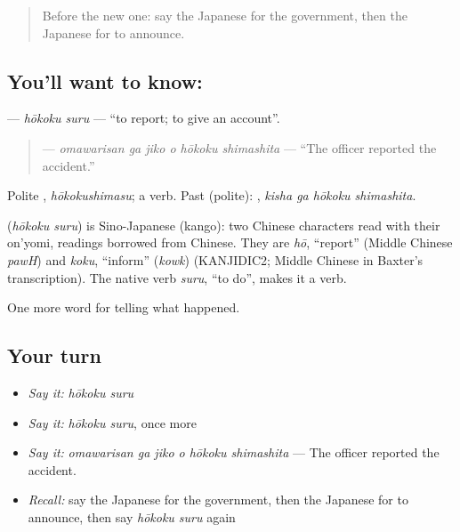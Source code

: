 \begin{quote}
Before the new one: say the Japanese for the government, then the Japanese for to announce.
\end{quote}

\subsection*{You'll want to know: }
\textbf{} — \emph{hōkoku suru} — \textquotedblleft{}to report; to give an account\textquotedblright{}.

\begin{quote}
\textbf{  } — \emph{omawarisan ga jiko o hōkoku shimashita} — \textquotedblleft{}The officer reported the accident.\textquotedblright{}
\end{quote}

Polite \textbf{}, \emph{hōkokushimasu}; a  verb. Past (polite): \textbf{ }, \emph{kisha ga hōkoku shimashita}.

\begin{cousinweb}
\textbf{} (\emph{hōkoku suru}) is Sino-Japanese (kango): two Chinese characters read with their on'yomi, readings borrowed from Chinese. They are \emph{hō}, \textquotedblleft{}report\textquotedblright{} (Middle Chinese \emph{pawH}) and \emph{koku}, \textquotedblleft{}inform\textquotedblright{} (\emph{kowk}) (KANJIDIC2; Middle Chinese in Baxter's transcription). The native verb \emph{suru}, \textquotedblleft{}to do\textquotedblright{}, makes it a verb.
\end{cousinweb}

\begin{grammarlens}[title={What you've built}]
One more word for telling what happened.
\end{grammarlens}

\subsection*{Your turn}
\begin{itemize}
\raggedright
  \item \emph{Say it:} \emph{hōkoku suru}
  \item \emph{Say it:} \emph{hōkoku suru}, once more
  \item \emph{Say it:} \emph{omawarisan ga jiko o hōkoku shimashita} — The officer reported the accident.
  \item \emph{Recall:} say the Japanese for the government, then the Japanese for to announce, then say \emph{hōkoku suru} again
\end{itemize}

